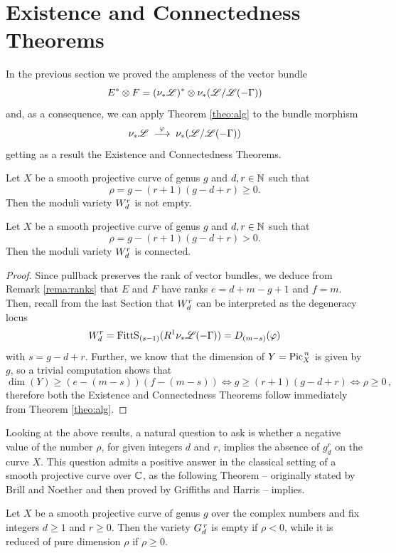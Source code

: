 \section{Existence and Connectedness Theorems}
	In the previous section we proved the ampleness of the vector bundle 
	$$ E^*\otimes F = (\nu_{*} \mathscr{L})^* \otimes \nu_{*} (\mathscr{L}/\mathscr{L}(-\Gamma)) $$
	and, as a consequence, we can apply Theorem \ref{theo:alg} to the bundle morphism
	$$ \nu_{*} \mathscr{L} \;\overset{\varphi}\longrightarrow\; \nu_{*} (\mathscr{L} / \mathscr{L}(-\Gamma)) $$
	getting as a result the Existence and Connectedness Theorems.
	\begin{namedtheo}\label{thm:existence}
		Let $X$ be a smooth projective curve of genus $g$ and $d,r\in \mathbb{N}$ such that
		$$ \rho = g-(r+1)(g-d+r) \geq 0. $$
		Then the moduli variety $W_d^r$ is not empty.
	\end{namedtheo}
	\begin{namedtheo}
		Let $X$ be a smooth projective curve of genus $g$ and $d,r\in \mathbb{N}$ such that
		$$ \rho = g-(r+1)(g-d+r) > 0. $$
		Then the moduli variety $W_d^r$ is connected.	
	\end{namedtheo}
	\begin{proof}
		Since pullback preserves the rank of vector bundles, we deduce from Remark \ref{rema:ranks} that $E$ and $F$ have ranks $e=d+m-g+1$ and $f=m$.
		Then, recall from the last Section that $W_d^r$ can be interpreted as the degeneracy locus
		$$ W_d^r = \operatorname{FittS}_{(s-1)}(R^1\nu_{*}\mathscr{L}(-\Gamma)) = D_{(m-s)}(\varphi) $$
		with $s=g-d+r$. Further, we know that the dimension of $Y=\operatorname{Pic}^{\,n}_X$ is given by $g$, so a trivial computation shows that
		$$ \dim(Y) \geq (e-(m-s))(f-(m-s)) \iff g \geq (r+1)(g-d+r) \iff \rho \geq 0\,, $$
		therefore both the Existence and Connectedness Theorems follow immediately from Theorem \ref{theo:alg}.
	\end{proof}
	Looking at the above results, a natural question to ask is whether a negative value of the \BN number $\rho$, for given integers $d$ and $r$, implies the absence of $g_d^r$ on the curve $X$. This question admits a positive answer in the classical setting of a smooth projective curve over $\mathbb{C}$, as the following Theorem -- originally stated by Brill and Noether and then proved by Griffiths and Harris -- implies.
	\begin{namedtheo}
		Let $X$ be a smooth projective curve of genus $g$ over the complex numbers and fix integers $d\geq 1$ and $r\geq 0$. Then the variety $G_d^{\,r}$ is empty if $\rho<0$, while it is reduced of pure dimension $\rho$ if $\rho\geq 0$.
	\end{namedtheo}
